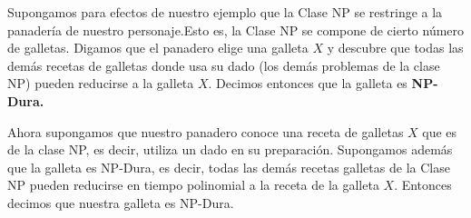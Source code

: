 \documentclass[11 pt, a4paper]{article}
\theoremstyle{definition}
\begin{document}
\begin{enumerate}

            Supongamos para efectos de nuestro ejemplo que la Clase NP se restringe a la panader\'ia de nuestro personaje.Esto es, la Clase NP se compone de cierto n\'umero de galletas. Digamos que el panadero elige una galleta $X$ y descubre que todas las dem\'as recetas de galletas donde usa su dado (los dem\'as problemas de la clase NP) pueden reducirse a la galleta $X$. Decimos entonces que la galleta es \textbf{NP-Dura.}


            Ahora supongamos que nuestro panadero conoce una receta de galletas $X$ que es de la clase NP, es decir, utiliza un dado en su preparaci\'on. Supongamos adem\'as que la galleta es NP-Dura, es decir, todas las dem\'as recetas galletas de la Clase NP pueden reducirse en tiempo polinomial a la receta de la galleta $X$. Entonces decimos que nuestra galleta es NP-Dura.

          

\end{enumerate}
\end{document}
